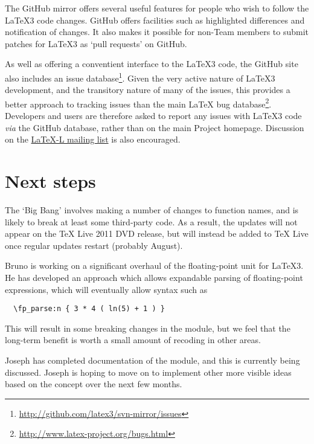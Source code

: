 \documentclass{ltnews}
\begin{document}
The GitHub mirror offers several useful features for people who wish to
follow the \LaTeX3 code changes. GitHub offers facilities such as highlighted
differences and notification of changes. It also makes it possible for
non-Team members to submit patches for \LaTeX3 as `pull requests' on
GitHub.

As well as offering a conventient interface to the \LaTeX3 code, the GitHub
site also includes an issue database\footnote{%
\url{http://github.com/latex3/svn-mirror/issues}}. Given the very
active nature of \LaTeX3 development, and the transitory nature of many
of the issues, this provides a better approach to tracking issues than
the main \LaTeX{} bug database\footnote{\url{http://www.latex-project.org/bugs.html}}.
Developers and users are
therefore asked to report any issues with \LaTeX3 code \emph{via} the GitHub
database, rather than on the main Project homepage.
Discussion on the \href{http://www.latex-project.org/code.html}{\mbox{LaTeX-L} mailing list}
is also encouraged.

\section{Next steps}

The `Big Bang' involves making a number of changes to  function
names, and is likely to break at least some third-party code. As a result,
the updates will not appear on the \TeX{} Live 2011 DVD release, but will
instead be added to \TeX{} Live once regular updates restart (probably
August).

Bruno is working on a significant overhaul of the  floating-point
unit for \LaTeX3. He has developed an approach which allows expandable
parsing of floating-point expressions, which will eventually allow syntax
such as
\begin{verbatim}
  \fp_parse:n { 3 * 4 ( ln(5) + 1 ) }
\end{verbatim}
This will result in some breaking changes in the  module, but
we feel that the long-term benefit is worth a small amount of recoding in other
areas.

Joseph has completed documentation of the  module, and this is
currently being discussed. Joseph is hoping to move on to implement other
more visible ideas based on the  concept over the next few
months.
\end{document}

